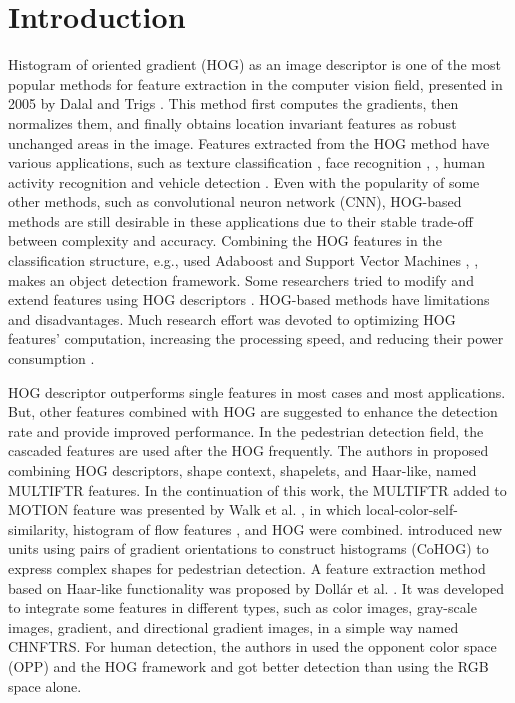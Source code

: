 \documentclass{elsarticle}
\begin{document}
\section{Introduction}
Histogram of oriented gradient (HOG) as an image descriptor is one of the most popular methods for feature extraction in the computer vision field, presented in 2005 by Dalal and Trigs \cite{H1}. This method first computes the gradients, then normalizes them, and finally obtains location invariant features as robust unchanged areas in the image.
Features extracted from the HOG method have various applications, such as texture classification \cite{H2}, face recognition \cite{H3}, \cite{H4}, human activity recognition \cite{H6} and vehicle detection \cite{H7}. Even with the popularity of some other methods, such as convolutional neuron network
(CNN), HOG-based methods are still desirable in these
applications due to their stable trade-off between complexity and accuracy.
Combining the HOG features in the classification structure, e.g., used Adaboost \cite{H8} and Support Vector Machines \cite{H9}, \cite{H10}, makes an object detection framework. Some researchers tried to modify and extend features using HOG descriptors \cite{H11,H12}.
HOG-based methods have limitations and disadvantages. Much research effort was devoted to optimizing HOG features' computation, increasing the processing speed, and reducing their power consumption \cite{H13,H14,H15}. 

HOG descriptor outperforms single features in most cases and most applications. But, other features combined with HOG are suggested to enhance the detection rate and provide improved performance.
In the pedestrian detection field, the cascaded features are used after the HOG frequently. The authors in \cite{H23} proposed combining HOG descriptors, shape context, shapelets, and Haar-like, named MULTIFTR features. In the continuation of this work, the MULTIFTR added to MOTION feature was presented by Walk et al. \cite{H24}, in which local-color-self-similarity, histogram of flow features \cite{H1}, and HOG were combined. 
\cite{H25} introduced new units using pairs of gradient orientations to construct histograms (CoHOG) to express complex shapes for pedestrian detection. 
A feature extraction method based on Haar-like functionality was proposed by Dollár et al. \cite{H26}. It was developed to integrate some features in different types, such as color images, gray-scale images, gradient, and directional gradient images, in a simple way named CHNFTRS. For human detection, the authors in \cite{H27} used the opponent color space (OPP) and the HOG framework and got better detection than using the RGB space alone.
\end{document}
